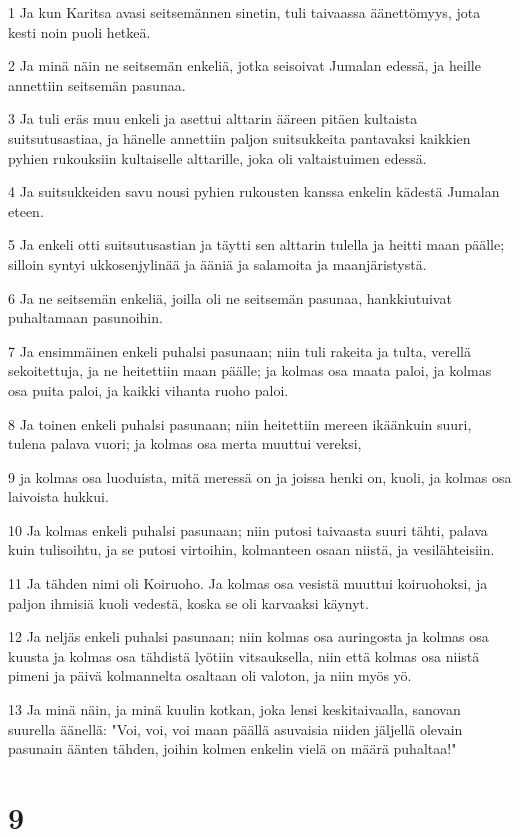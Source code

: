 \par 1 Ja kun Karitsa avasi seitsemännen sinetin, tuli taivaassa äänettömyys, jota kesti noin puoli hetkeä.
\par 2 Ja minä näin ne seitsemän enkeliä, jotka seisoivat Jumalan edessä, ja heille annettiin seitsemän pasunaa.
\par 3 Ja tuli eräs muu enkeli ja asettui alttarin ääreen pitäen kultaista suitsutusastiaa, ja hänelle annettiin paljon suitsukkeita pantavaksi kaikkien pyhien rukouksiin kultaiselle alttarille, joka oli valtaistuimen edessä.
\par 4 Ja suitsukkeiden savu nousi pyhien rukousten kanssa enkelin kädestä Jumalan eteen.
\par 5 Ja enkeli otti suitsutusastian ja täytti sen alttarin tulella ja heitti maan päälle; silloin syntyi ukkosenjylinää ja ääniä ja salamoita ja maanjäristystä.
\par 6 Ja ne seitsemän enkeliä, joilla oli ne seitsemän pasunaa, hankkiutuivat puhaltamaan pasunoihin.
\par 7 Ja ensimmäinen enkeli puhalsi pasunaan; niin tuli rakeita ja tulta, verellä sekoitettuja, ja ne heitettiin maan päälle; ja kolmas osa maata paloi, ja kolmas osa puita paloi, ja kaikki vihanta ruoho paloi.
\par 8 Ja toinen enkeli puhalsi pasunaan; niin heitettiin mereen ikäänkuin suuri, tulena palava vuori; ja kolmas osa merta muuttui vereksi,
\par 9 ja kolmas osa luoduista, mitä meressä on ja joissa henki on, kuoli, ja kolmas osa laivoista hukkui.
\par 10 Ja kolmas enkeli puhalsi pasunaan; niin putosi taivaasta suuri tähti, palava kuin tulisoihtu, ja se putosi virtoihin, kolmanteen osaan niistä, ja vesilähteisiin.
\par 11 Ja tähden nimi oli Koiruoho. Ja kolmas osa vesistä muuttui koiruohoksi, ja paljon ihmisiä kuoli vedestä, koska se oli karvaaksi käynyt.
\par 12 Ja neljäs enkeli puhalsi pasunaan; niin kolmas osa auringosta ja kolmas osa kuusta ja kolmas osa tähdistä lyötiin vitsauksella, niin että kolmas osa niistä pimeni ja päivä kolmannelta osaltaan oli valoton, ja niin myös yö.
\par 13 Ja minä näin, ja minä kuulin kotkan, joka lensi keskitaivaalla, sanovan suurella äänellä: "Voi, voi, voi maan päällä asuvaisia niiden jäljellä olevain pasunain äänten tähden, joihin kolmen enkelin vielä on määrä puhaltaa!"

\chapter{9}

